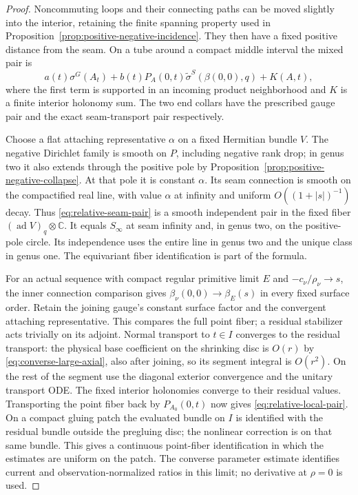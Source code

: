 \documentclass[11pt]{amsart}
\theoremstyle{definition}
\theoremstyle{remark}
\theoremstyle{plain}
\begin{document}
\begin{proof}
Noncommuting loops and their connecting paths can be moved
slightly into the interior, retaining the finite spanning
property used in Proposition~\ref{prop:positive-negative-incidence}.
They then have a fixed positive distance from the seam.
On a tube around a compact middle interval the mixed pair is
\[
 a(t)\sigma^G(A_t)
   +b(t)P_A(0,t)\widetilde\sigma^S(\beta(0,0),q)+K(A,t),
\]
where the first term is supported in an incoming product
neighborhood and $K$ is a finite interior holonomy sum.
The two end collars have the prescribed gauge pair and
the exact seam-transport pair respectively.

Choose a flat attaching representative $\alpha$ on a fixed
Hermitian bundle $V$. The negative Dirichlet family is smooth
on $P$, including negative rank drop; in genus two it also
extends through the positive pole by
Proposition~\ref{prop:positive-negative-collapse}.
At that pole it is constant $\alpha$.
Its seam connection is smooth on the compactified real line,
with value $\alpha$ at infinity and uniform $O((1+|s|)^{-1})$
decay. Thus \eqref{eq:relative-seam-pair} is a smooth independent
pair in the fixed fiber $(\operatorname{ad}V)_q\otimes\mathbb C$.
It equals $S_\infty$ at seam infinity and, in genus two,
on the positive-pole circle. Its independence uses the entire
line in genus two and the unique class in genus one. The
equivariant fiber identification is part of the formula.

For an actual sequence with compact regular primitive limit
$E$ and $-c_\nu/\rho_\nu\to s$, the inner connection comparison
gives $\beta_\nu(0,0)\to\beta_E(s)$ in every fixed surface order.
Retain the joining gauge's constant surface factor and the
convergent attaching representative. This compares the full
point fiber; a residual stabilizer acts trivially on its adjoint.
Normal transport to $t\in I$ converges to the residual transport:
the physical base coefficient on the shrinking disc is $O(r)$
by \eqref{eq:converse-large-axial}, also after joining, so its
segment integral is $O(r^2)$. On the rest of the segment use
the diagonal exterior convergence and the unitary transport ODE.
The fixed interior holonomies converge to their residual values.
Transporting the point fiber back by $P_{A_0}(0,t)$ now gives
\eqref{eq:relative-local-pair}. On a compact gluing patch the
evaluated bundle on $I$ is identified with the residual bundle
outside the pregluing disc; the nonlinear correction is on
that same bundle. This gives a continuous point-fiber
identification in which the estimates are uniform on the patch.
The converse parameter estimate
identifies current and observation-normalized ratios in this
limit; no derivative at $\rho=0$ is used.


\end{proof}
\end{document}
